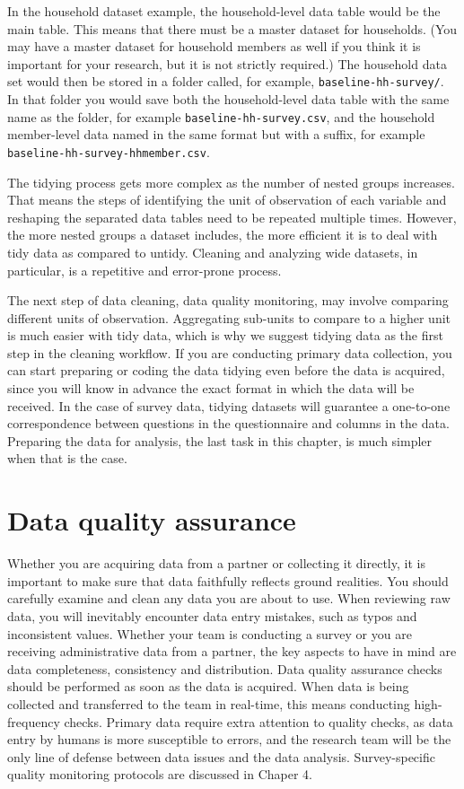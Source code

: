 In the household dataset example,
the household-level data table would be the main table.
This means that there must be a master dataset for households.
(You may have a master dataset for household members as well
if you think it is important for your research,
but it is not strictly required.)
The household data set would then be stored in a folder called,
for example, \texttt{baseline-hh-survey/}.
In that folder you would save both
the household-level data table with the same name as the folder,
for example \texttt{baseline-hh-survey.csv},
and the household member-level data named in the same format but with a suffix,
for example \texttt{baseline-hh-survey-hhmember.csv}.

The tidying process gets more complex as the number of nested groups increases.
That means the steps of identifying the unit of observation of each variable
and reshaping the separated data tables need to be repeated multiple times.
However, the more nested groups a dataset includes,
the more efficient it is to deal with tidy data as compared to untidy.
Cleaning and analyzing wide datasets, in particular,
is a repetitive and error-prone process.

The next step of data cleaning, data quality monitoring,
may involve comparing different units of observation.
Aggregating sub-units to compare to a higher unit is much easier with tidy data,
which is why we suggest tidying data as the first step in the cleaning workflow.
If you are conducting primary data collection,
you can start preparing or coding the data tidying even before the data is acquired,
since you will know in advance the exact format in which the data will be received.
In the case of survey data,
tidying datasets will guarantee a one-to-one correspondence
between questions in the questionnaire and columns in the data.
Preparing the data for analysis, the last task in this chapter,
is much simpler when that is the case.

\section{Data quality assurance}

Whether you are acquiring data from a partner or collecting it directly,
it is important to make sure that data faithfully reflects ground realities.
You should carefully examine and clean any data you are about to use.
When reviewing raw data, you will inevitably encounter data entry mistakes,
such as typos and inconsistent values.
Whether your team is conducting a survey or 
you are receiving administrative data from a partner,
the key aspects to have in mind are 
data completeness, consistency and distribution.
Data quality assurance checks should be performed as soon as the data is acquired.
When data is being collected and transferred to the team in real-time,
this means conducting high-frequency checks.
Primary data require extra attention to quality checks, 
as data entry by humans is more susceptible to errors,
and the research team will be the only line of defense between
data issues and the data analysis.
Survey-specific quality monitoring protocols are discussed in Chaper 4.


